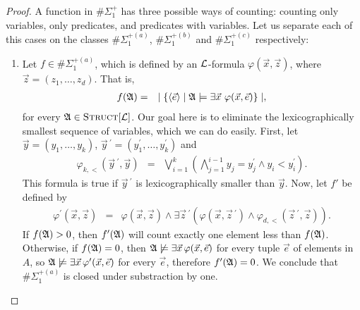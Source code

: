 \documentclass[12pt]{article}
\def\A{{\frak A}}
\def\L{{\cal L}}
\def\e{\vec{e}} %
\def\x{\vec{x}} %
\def\y{\vec{y}} %
\def\z{\vec{z}} %
\begin{document}
\begin{proof}
A function in $\#\Sigma_1^+$ has three possible ways of counting: counting only variables, only predicates, and predicates with variables. Let us separate each of this cases on the classes $\#\Sigma_1^{+(a)}$, $\#\Sigma_1^{+(b)}$ and $\#\Sigma_1^{+(c)}$ respectively:
\begin{enumerate}


\item Let $f \in \#\Sigma_1^{+(a)}$, which is defined by an $\L$-formula $\varphi(\x,\z)$, where $\z = (z_1,\dots,z_d)$. That is,
\begin{eqnarray*}
f(\A) &=& \mid \{ \langle\e\rangle \mid \A \models \exists \x \ \varphi(\x,\e) \} \mid,
\end{eqnarray*}
for every $\A \in \textsc{Struct}[\L]$. Our goal here is to eliminate the lexicographically smallest sequence of variables, which we can do easily. First, let $\y = (y_1,\dots,y_k)$, $\y\,^\prime = (y_1^\prime,\dots,y_k^\prime)$ and
\begin{eqnarray*}
\varphi_{k,<}(\y\,^\prime,\y) &=& \bigvee_{i = 1}^k \left( \bigwedge_{j=1}^{i-1} y_j = y_j^\prime \wedge y_i < y_i^\prime \right).
\end{eqnarray*}
This formula is true if $\y\,^\prime$ is lexicographically smaller than $\y$. Now, let $f'$ be defined by
\begin{eqnarray*}
\varphi^\prime(\x,\z) &=& \varphi(\x,\z) \wedge \exists \z\,^\prime (\varphi(\x,\z\,^\prime) \wedge \varphi_{d,<}(\z\,^\prime,\z ) ).
\end{eqnarray*}
If $f(\A)>0$, then $f'(\A)$ will count exactly one element less than $f(\A)$. Otherwise, if $f(\A)=0$, then $\A \not\models\exists \x\,\varphi(\x,\e)$ for every tuple $\e$ of elements in $A$, so $\A \not\models\exists \x\,\varphi^\prime(\x,\e)$ for every $\e$, therefore $f'(\A)=0$. We conclude that $\#\Sigma_1^{+(a)}$ is closed under substraction by one.



\end{enumerate}
\end{proof}
\end{document}
